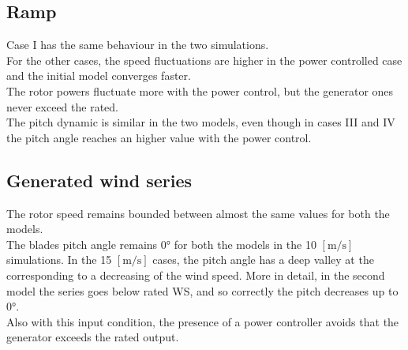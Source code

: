 \subsection{Ramp}
Case I has the same behaviour in the two simulations.\\
For the other cases, the speed fluctuations are higher in the power controlled case and the initial model converges faster.\\
The rotor powers fluctuate more with the power control, but the generator ones never exceed the rated. \\
The pitch dynamic is similar in the two models, even though in cases III and IV the pitch angle reaches an higher value with the power control.
\subsection{Generated wind series}
The rotor speed remains bounded between almost the same values for both the models.\\
The blades pitch angle remains 0$\si{\degree}$ for both the models in the 10 $\left[\si{\meter\per\second}\right]$ simulations. In the 15 $\left[\si{\meter\per\second}\right]$ cases, the pitch angle has a deep valley at the corresponding to a decreasing of the wind speed. More in detail, in the second model the series goes below rated \acrshort{WS}, and so correctly the pitch decreases up to  0$\si{\degree}$.\\
Also with this input condition, the presence of a power controller avoids that the generator exceeds the rated output.